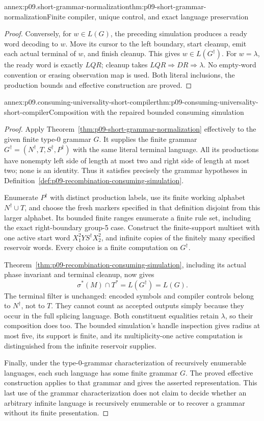 \begin{annexitem}{annex:p09.short-grammar-normalization}{thm:p09-short-grammar-normalization}{Finite compiler, unique control, and exact language preservation}
\begin{proof}
Conversely, for \(w\in L(G)\), the preceding simulation produces a
ready word decoding to \(w\). Move its cursor to the left boundary,
start cleanup, emit each actual terminal of \(w\), and finish cleanup.
This gives \(w\in L(G^\dagger)\).
For \(w=\lambda\), the ready word is exactly \(LQR\); cleanup takes
\(LQR\Longrightarrow DR\Longrightarrow\lambda\).
No empty-word convention or erasing observation map is used. Both literal
inclusions, the production bounds and effective construction are proved.
\end{proof}
\end{annexitem}

\begin{annexitem}{annex:p09.consuming-universality-short-compiler}{thm:p09-consuming-universality-short-compiler}{Composition with the repaired bounded consuming simulation}
\begin{proof}
Apply Theorem~\ref{thm:p09-short-grammar-normalization} effectively to the
given finite type-0 grammar \(G\). It supplies the finite grammar
\(G^\dagger=(N^\dagger,T,S^\dagger,P^\dagger)\) with the same literal
terminal language. All its productions have nonempty left side of length
at most two and right side of length at most two; none is an identity.
Thus it satisfies precisely the grammar hypotheses in
Definition~\ref{def:p09-recombination-consuming-simulation}.

Enumerate \(P^\dagger\) with distinct production labels, use its finite
working alphabet \(N^\dagger\cup T\), and choose the fresh markers
specified in that definition disjoint from this larger alphabet.
Its bounded finite ranges enumerate a finite rule set, including the
exact right-boundary group-5 case. Construct the finite-support multiset
with one active start word \(X_1^2YS^\dagger X_2^2\), and infinite
copies of the finitely many specified reservoir words.
Every choice is a finite computation on \(G^\dagger\).

Theorem~\ref{thm:p09-recombination-consuming-simulation}, including its
actual phase invariant and terminal cleanup, now gives
\[
 \sigma^*(M)\cap T^*=L(G^\dagger)=L(G).
\]
The terminal filter is unchanged: encoded symbols and compiler controls
belong to \(N^\dagger\), not to \(T\). They cannot count as accepted
outputs simply because they occur in the full splicing language.
Both constituent equalities retain \(\lambda\), so their composition does
too. The bounded simulation's handle inspection gives radius at most five,
its support is finite, and its multiplicity-one active computation is
distinguished from the infinite reservoir supplies.

Finally, under the type-0-grammar characterization of recursively enumerable
languages, each such language has some finite grammar \(G\).
The proved effective construction applies to that grammar and gives the
asserted representation. This last use of the grammar characterization
does not claim to decide whether an arbitrary infinite language is recursively
enumerable or to recover a grammar without its finite presentation.
\end{proof}
\end{annexitem}
